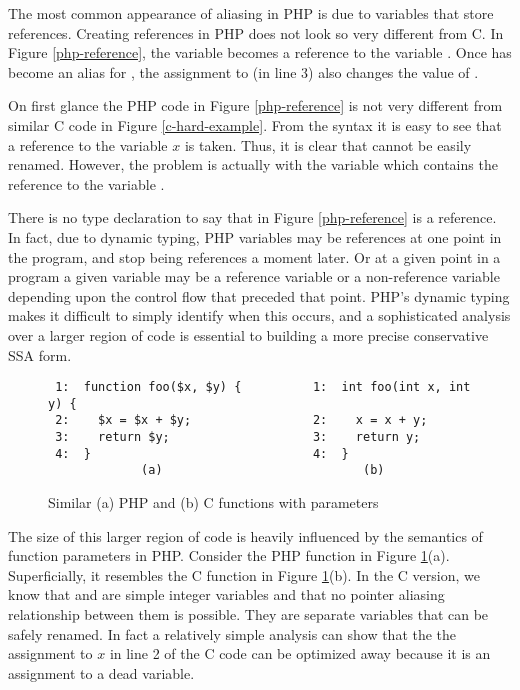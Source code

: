 The most common appearance of aliasing in PHP is due to variables that
store references. Creating references in PHP does not look so very
different from C. In Figure \ref{php-reference}, the variable 
becomes a reference to the variable . Once  has become an alias
for , the assignment to  (in line 3) also changes the value of
.

On first glance the PHP code in Figure \ref{php-reference} is not very
different from similar C code in Figure \ref{c-hard-example}. From the
syntax it is easy to see that a reference to the variable $x$ is
taken.  Thus, it is clear that  cannot be easily renamed. However,
the problem is actually with the variable  which contains the
reference to the variable .

There is no type declaration to say that  in Figure
\ref{php-reference} is a reference. In fact, due to dynamic typing,
PHP variables may be references at one point in the program, and stop
being references a moment later. Or at a given point in a program a
given variable may be a reference variable or a non-reference variable
depending upon the control flow that preceded that point.  PHP's
dynamic typing makes it difficult to simply identify when this occurs,
and a sophisticated analysis over a larger region of code is essential
to building a more precise conservative SSA form.

\begin{figure}[thp]
\begin{verbatim}
 1:  function foo($x, $y) {          1:  int foo(int x, int y) {
 2:    $x = $x + $y;                 2:    x = x + y;
 3:    return $y;                    3:    return y;
 4:  }                               4:  }
             (a)                            (b)
\end{verbatim}
\caption{Similar (a) PHP and (b) C functions with parameters}
\label{parameters}
\end{figure}

The size of this larger region of code is heavily influenced by the
semantics of function parameters in PHP. Consider the PHP function in
Figure \ref{parameters}(a).
Superficially, it resembles the C function in Figure \ref{parameters}(b).
In the C version, we know that  and  are simple integer
variables and that no pointer aliasing relationship between them is
possible.  They are separate variables that can be safely renamed. In
fact a relatively simple analysis can show that the the assignment to
$x$ in line 2 of the C code can be optimized away because it is an
assignment to a dead variable.

